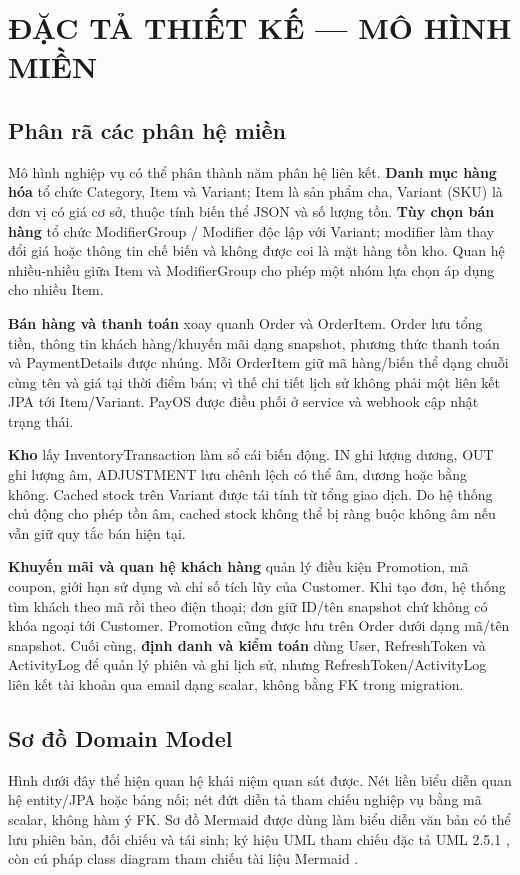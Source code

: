 \documentclass[12pt,a4paper,oneside]{report}
\begin{document}
\chapter{ĐẶC TẢ THIẾT KẾ — MÔ HÌNH MIỀN}

\section{Phân rã các phân hệ miền}
Mô hình nghiệp vụ có thể phân thành năm phân hệ liên kết. \textbf{Danh mục hàng hóa} tổ chức Category, Item và Variant; Item là sản phẩm cha, Variant (SKU) là đơn vị có giá cơ sở, thuộc tính biến thể JSON và số lượng tồn. \textbf{Tùy chọn bán hàng} tổ chức ModifierGroup / Modifier độc lập với Variant; modifier làm thay đổi giá hoặc thông tin chế biến và không được coi là mặt hàng tồn kho. Quan hệ nhiều-nhiều giữa Item và ModifierGroup cho phép một nhóm lựa chọn áp dụng cho nhiều Item.

\textbf{Bán hàng và thanh toán} xoay quanh Order và OrderItem. Order lưu tổng tiền, thông tin khách hàng/khuyến mãi dạng snapshot, phương thức thanh toán và PaymentDetails được nhúng. Mỗi OrderItem giữ mã hàng/biến thể dạng chuỗi cùng tên và giá tại thời điểm bán; vì thế chi tiết lịch sử không phải một liên kết JPA tới Item/Variant. PayOS được điều phối ở service và webhook cập nhật trạng thái.

\textbf{Kho} lấy InventoryTransaction làm sổ cái biến động. IN ghi lượng dương, OUT ghi lượng âm, ADJUSTMENT lưu chênh lệch có thể âm, dương hoặc bằng không. Cached stock trên Variant được tái tính từ tổng giao dịch. Do hệ thống chủ động cho phép tồn âm, cached stock không thể bị ràng buộc không âm nếu vẫn giữ quy tắc bán hiện tại.

\textbf{Khuyến mãi và quan hệ khách hàng} quản lý điều kiện Promotion, mã coupon, giới hạn sử dụng và chỉ số tích lũy của Customer. Khi tạo đơn, hệ thống tìm khách theo mã rồi theo điện thoại; đơn giữ ID/tên snapshot chứ không có khóa ngoại tới Customer. Promotion cũng được lưu trên Order dưới dạng mã/tên snapshot. Cuối cùng, \textbf{định danh và kiểm toán} dùng User, RefreshToken và ActivityLog để quản lý phiên và ghi lịch sử, nhưng RefreshToken/ActivityLog liên kết tài khoản qua email dạng scalar, không bằng FK trong migration.

\section{Sơ đồ Domain Model}
Hình dưới đây thể hiện quan hệ khái niệm quan sát được. Nét liền biểu diễn quan hệ entity/JPA hoặc bảng nối; nét đứt diễn tả tham chiếu nghiệp vụ bằng mã scalar, không hàm ý FK. Sơ đồ Mermaid được dùng làm biểu diễn văn bản có thể lưu phiên bản, đối chiếu và tái sinh; ký hiệu UML tham chiếu đặc tả UML 2.5.1 \cite{uml}, còn cú pháp class diagram tham chiếu tài liệu Mermaid \cite{mermaidclass,mermaider}.
\end{document}
